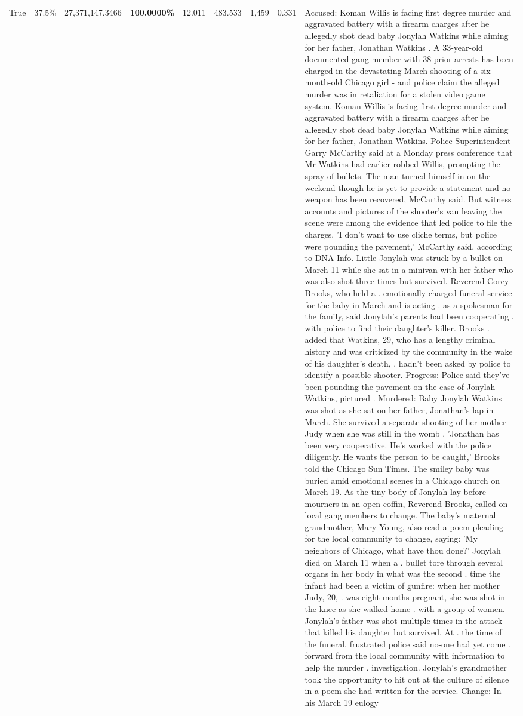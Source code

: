 \begin{table}[H]
\begin{tabular}{lllrlllll}
True & 37.5\% & 27,371,147.3466 & \bfseries \color{red} 100.0000\% & 12.011 & 483.533 & 1,459 & 0.331 & Accused: Koman Willis is facing first degree murder and aggravated battery with a firearm charges after he allegedly shot dead baby Jonylah Watkins while aiming for her father, Jonathan Watkins . A 33-year-old documented gang member with 38 prior arrests has been charged in the devastating March shooting of a six-month-old Chicago girl - and police claim the alleged murder was in retaliation for a stolen video game system. Koman Willis is facing first degree murder and aggravated battery with a firearm charges after he allegedly shot dead baby Jonylah Watkins while aiming for her father, Jonathan Watkins. Police Superintendent Garry McCarthy said at a Monday press conference that Mr Watkins had earlier robbed Willis, prompting the spray of bullets. The man turned himself in on the weekend though he is yet to provide a statement and no weapon has been recovered, McCarthy said. But witness accounts and pictures of the shooter's van leaving the scene were among the evidence that led police to file the charges. 'I don't want to use cliche terms, but police were pounding the pavement,' McCarthy said, according to DNA Info. Little Jonylah was struck by a bullet on March 11 while she sat in a minivan with her father who was also shot three times but survived. Reverend Corey Brooks, who held a . emotionally-charged funeral service for the baby in March and is acting . as a spokesman for the family, said Jonylah's parents had been cooperating . with police to find their daughter's killer. Brooks . added that Watkins, 29, who has a lengthy criminal history and was criticized by the community in the wake of his daughter's death, . hadn't been asked by police to identify a possible shooter. Progress: Police said they've been pounding the pavement on the case of Jonylah Watkins, pictured . Murdered: Baby Jonylah Watkins was shot as she sat on her father, Jonathan's lap in March. She survived a separate shooting of her mother Judy when she was still in the womb . 'Jonathan has been very cooperative. He's worked with the police diligently. He wants the person to be caught,' Brooks told the Chicago Sun Times. The smiley baby was buried amid emotional scenes in a Chicago church on March 19. As the tiny body of Jonylah lay before mourners in an open coffin, Reverend Brooks, called on local gang members to change. The baby's maternal grandmother, Mary Young, also read a poem pleading for the local community to change, saying: 'My neighbors of Chicago, what have thou done?' Jonylah died on March 11 when a . bullet tore through several organs in her body in what was the second . time the infant had been a victim of gunfire: when her mother Judy, 20, . was eight months pregnant, she was shot in the knee as she walked home . with a group of women. Jonylah's father was shot multiple times in the attack that killed his daughter but survived. At . the time of the funeral, frustrated police said no-one had yet come . forward from the local community with information to help the murder . investigation. Jonylah's grandmother took the opportunity to hit out at the culture of silence in a poem she had written for the service. Change: In his March 19 eulogy 
\end{tabular}
\end{table}
